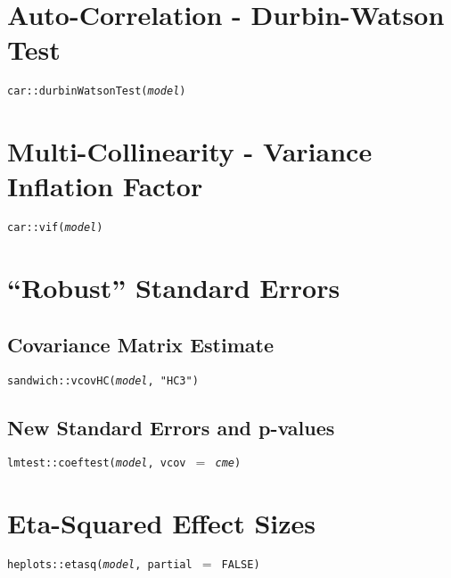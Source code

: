 \documentclass{tufte-handout}
\newenvironment{subs}
  {\adjustwidth{3em}{0pt}}
  {\endadjustwidth}
\begin{document}
\vspace{5mm}
\section{Auto-Correlation - Durbin-Watson Test}
\noindent \texttt{car::}{\color{red}\texttt{durbinWatsonTest}}\texttt{(\textit{model})} 

\vspace{5mm}
\section{Multi-Collinearity - Variance Inflation Factor}
\noindent \texttt{car::}{\color{red}\texttt{vif}}\texttt{(\textit{model})} 

\newpage
\section{``Robust'' Standard Errors}
\begin{subs}
\subsection{Covariance Matrix Estimate}
\noindent \texttt{sandwich::}{\color{red}\texttt{vcovHC}}\texttt{(\textit{model}, "HC3")} 

\vspace{3mm}
\subsection{New Standard Errors and p-values}
\noindent \texttt{lmtest::}{\color{red}\texttt{coeftest}}\texttt{(\textit{model}, vcov $=$ \textit{cme})} 
\end{subs}

\vspace{5mm}
\section{Eta-Squared Effect Sizes}
\noindent \texttt{heplots::}{\color{red}\texttt{etasq}}\texttt{(\textit{model}, partial $=$ FALSE)} 
\end{document}
